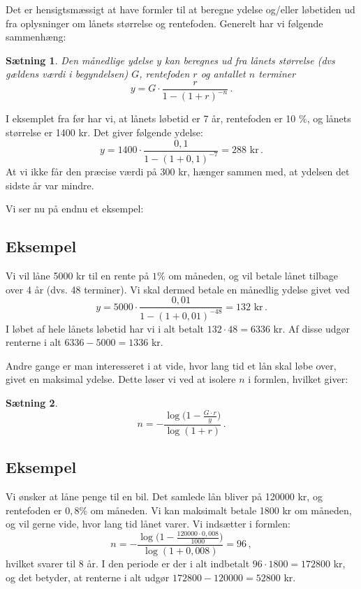 \documentclass[12pt,oneside,a4paper]{article}
\newtheorem{thm}{Sætning}[section]
\begin{document}
Det er hensigtsmæssigt at have formler til at beregne ydelse og/eller løbetiden
ud fra oplysninger om lånets størrelse og rentefoden.  Generelt har vi følgende
sammenhæng:
\begin{tcolorbox}
\begin{thm}
Den månedlige ydelse $y$ kan beregnes ud fra lånets størrelse (dvs gældens
værdi i begyndelsen) $G$, rentefoden $r$ og antallet $n$ terminer
\[
    y = G\cdot\frac{r}{1-(1+r)^{-n}}\,.
\]
\end{thm}
\end{tcolorbox}

I eksemplet fra før har vi, at lånets løbetid er 7 år, rentefoden er 10 $\%$, og
lånets størrelse er 1400 kr. Det giver følgende ydelse:
\[
y = 1400\cdot\frac{0,1}{1-(1+0,1)^{-7}} = 288 \,\,\mbox{kr}\,.
\]
At vi ikke får den præcise værdi på 300 kr, hænger sammen med, at ydelsen det
sidste år var mindre.

Vi ser nu på endnu et eksempel:
\begin{tcolorbox}
\subsection*{Eksempel}
Vi vil låne 5000 kr til en rente på $1 \%$ om måneden, og vil betale lånet tilbage over 
4 år (dvs. 48 terminer).
Vi skal dermed betale en månedlig ydelse givet ved
\[
    y = 5000\cdot\frac{0,01}{1-(1+0,01)^{-48}} = 132 \,\,\mbox {kr} \,. 
\]
I løbet af hele lånets løbetid har vi i alt betalt $132\cdot 48 = 6336$ kr. Af
disse udgør renterne i alt $6336-5000 = 1336$ kr.
\end{tcolorbox}

Andre gange er man interesseret i at vide, hvor lang tid et lån skal løbe over, givet
en maksimal ydelse. Dette løser vi ved at isolere $n$ i formlen, hvilket giver:
\begin{tcolorbox}
\begin{thm}
\[
    n = -\frac{\log\big(1-\frac{G\cdot r}{y}\big)}{\log(1+r)} \,.
\]
\end{thm}
\end{tcolorbox}

\begin{tcolorbox}
\subsection*{Eksempel}
Vi ønsker at låne penge til en bil. Det samlede lån bliver på 120000 kr, og
rentefoden er $0,8\%$ om måneden. Vi kan maksimalt betale 1800 kr om
måneden, og vil gerne vide, hvor lang tid lånet varer.  Vi indsætter i
formlen:
\[
n = -\frac{\log\big(1-\frac{120000\cdot0,008}{1000}\big)}{\log(1+0,008)} = 96 \,,
\]
hvilket svarer til 8 år.
I den periode er der i alt indbetalt $96\cdot 1800 = 172800$ kr, og det betyder,
at renterne i alt udgør $172800-120000 = 52800$ kr.
\end{tcolorbox}
\end{document}
